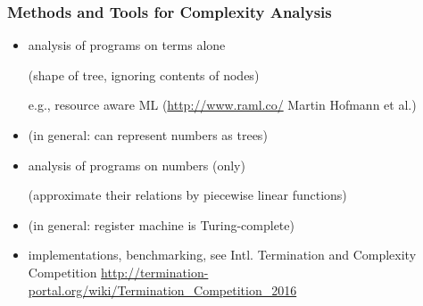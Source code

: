 \begin{frame}[fragile]
\frametitle{Methods and Tools for Complexity Analysis}

  \begin{itemize}[<+->]
\item analysis of programs on terms alone 

(shape of tree, ignoring contents of nodes) 

e.g., resource aware ML (\url{http://www.raml.co/} 
Martin Hofmann et al.)
\item (in general: can represent numbers as trees)
\item analysis of programs on numbers (only) 

  (approximate their relations by piecewise linear functions)
\item (in general: register machine is Turing-complete)

\item implementations, benchmarking, 
see Intl. Termination and Complexity Competition 
\url{http://termination-portal.org/wiki/Termination_Competition_2016}
  \end{itemize}

\end{frame}
